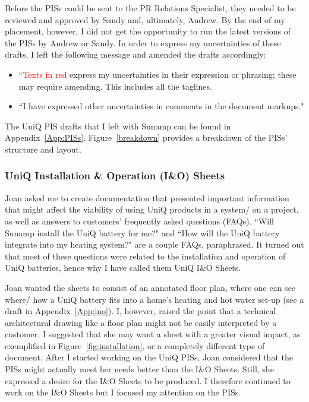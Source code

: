 Before the PISs could be sent to the PR Relations Specialist, they needed to be reviewed and approved by Sandy and, ultimately, Andrew.
By the end of my placement, however, I did not get the opportunity to run the latest versions of the PISs by Andrew or Sandy.
In order to express my uncertainties of these drafts, I left the following message and amended the drafts accordingly:
\begin{itemize}
    \item ``\textcolor{red}{Texts in red} express my uncertainties in their expression or phrasing; these may require amending. This includes all the taglines.
    \item ``I have expressed other uncertainties in comments in the document markups."
\end{itemize}

The UniQ PIS drafts that I left with Sunamp can be found in Appendix~\ref{App:PISs}.
Figure~\ref{breakdown} provides a breakdown of the PISs' structure and layout.



\subsubsection{UniQ Installation \& Operation (I\&O) Sheets}

Joan asked me to create documentation that presented important information that might affect the viability of using UniQ products in a system/ on a project, as well as answers to customers' frequently asked questions (FAQs).
``Will Sunamp install the UniQ battery for me?" and ``How will the UniQ battery integrate into my heating system?" are a couple FAQs, paraphrased.
It turned out that most of these questions were related to the installation and operation of UniQ batteries, hence why I have called them UniQ I\&O Sheets.

Joan wanted the sheets to consist of an annotated floor plan, where one can see where/ how a UniQ battery fits into a home's heating and hot water set-up (see a draft in Appendix~\ref{App:ino}).
I, however, raised the point that a technical architectural drawing like a floor plan might not be easily interpreted by a customer.
I suggested that she may want a sheet with a greater visual impact, as exemplified in Figure~\ref{fig:installation}, or a completely different type of document.
After I started working on the UniQ PISs, Joan considered that the PISs might actually meet her needs better than the I\&O Sheets.
Still, she expressed a desire for the I\&O Sheets to be produced.
I therefore continued to work on the I\&O Sheets but I focused my attention on the PISs.


